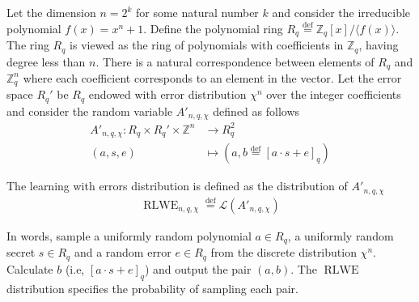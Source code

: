 Let the dimension $n = 2^k$ for some natural number $k$ and consider the irreducible polynomial $f(x) = x^n + 1$. Define the polynomial ring $R_q \stackrel{\mathrm{def}}{=} \mathbb{Z}_q[x] /\langle f(x)\rangle$. The ring $R_q$ is viewed as the ring of polynomials with coefficients in $\mathbb{Z}_q$, having degree less than $n$. There is a natural correspondence between elements of $R_q$ and $\mathbb{Z}_q^n$ where each coefficient corresponds to an element in the vector. Let the error space $R_q'$ be $R_q$ endowed with error distribution $\chi^n$ over the integer coefficients and consider the random variable $A'_{n, q, \chi}$ defined as follows
\begin{equation*}
\begin{aligned}
    A'_{n, q, \chi} \colon R_q \times R_q' \times \mathbb{Z}^n &\to R_q^2\\
    (a,s,e) &\mapsto (a, b \stackrel{\mathrm{def}}{=} [a \cdot s + e]_q)
\end{aligned}
\end{equation*}
\begin{definition}
    The learning with errors distribution is defined as the distribution of $A'_{n, q, \chi}$
    \begin{equation*}
    \begin{aligned}
        \operatorname{RLWE}_{n, q, \chi} \stackrel{\mathrm{def}}{=} \mathcal{L}(A'_{n, q, \chi})
    \end{aligned}
    \end{equation*}
\end{definition}
In words, sample a uniformly random polynomial $a \in R_q$, a uniformly random secret $s \in R_q$ and a random error $e \in R_q$ from the discrete distribution $\chi^n$. Calculate $b$ (i.e, $[a \cdot s + e]_q$) and output the pair $(a,b)$. The $\operatorname{RLWE}$ distribution specifies the probability of sampling each pair.

